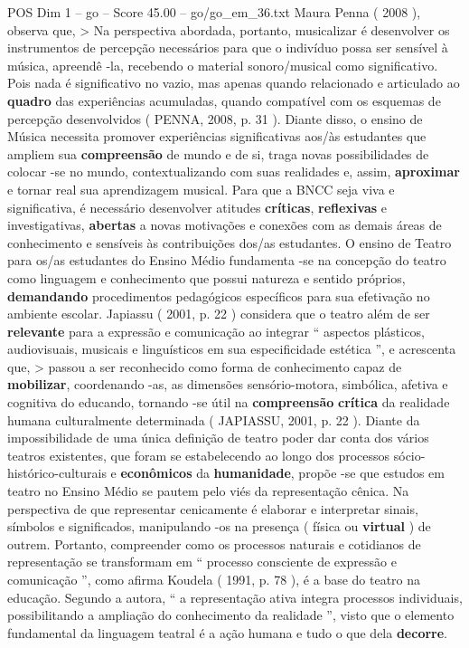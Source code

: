 \begin{textsample}{POS Dim 1 – go – Score 45.00 – go/go\_em\_36.txt}
Maura Penna ( 2008 ), observa que, > Na perspectiva abordada, portanto, musicalizar é desenvolver os instrumentos de percepção necessários para que o indivíduo possa ser sensível à música, apreendê -la, recebendo o material sonoro/musical como significativo.
Pois nada é significativo no vazio, mas apenas quando relacionado e articulado ao \textbf{quadro} das experiências acumuladas, quando compatível com os esquemas de percepção desenvolvidos ( PENNA, 2008, p. 31 ).
Diante disso, o ensino de Música necessita promover experiências significativas aos/às estudantes que ampliem sua \textbf{compreensão} de mundo e de si, traga novas possibilidades de colocar -se no mundo, contextualizando com suas realidades e, assim, \textbf{aproximar} e tornar real sua aprendizagem musical.
Para que a BNCC seja viva e significativa, é necessário desenvolver atitudes \textbf{críticas}, \textbf{reflexivas} e investigativas, \textbf{abertas} a novas motivações e conexões com as demais áreas de conhecimento e sensíveis às contribuições dos/as estudantes.
O ensino de Teatro para os/as estudantes do Ensino Médio fundamenta -se na concepção do teatro como linguagem e conhecimento que possui natureza e sentido próprios, \textbf{demandando} procedimentos pedagógicos específicos para sua efetivação no ambiente escolar.
Japiassu ( 2001, p. 22 ) considera que o teatro além de ser \textbf{relevante} para a expressão e comunicação ao integrar “ aspectos plásticos, audiovisuais, musicais e linguísticos em sua especificidade estética ”, e acrescenta que, > passou a ser reconhecido como forma de conhecimento capaz de \textbf{mobilizar}, coordenando -as, as dimensões sensório-motora, simbólica, afetiva e cognitiva do educando, tornando -se útil na \textbf{compreensão} \textbf{crítica} da realidade humana culturalmente determinada ( JAPIASSU, 2001, p. 22 ).
Diante da impossibilidade de uma única definição de teatro poder dar conta dos vários teatros existentes, que foram se estabelecendo ao longo dos processos sócio-histórico-culturais e \textbf{econômicos} da \textbf{humanidade}, propõe -se que estudos em teatro no Ensino Médio se pautem pelo viés da representação cênica.
Na perspectiva de que representar cenicamente é elaborar e interpretar sinais, símbolos e significados, manipulando -os na presença ( física ou \textbf{virtual} ) de outrem.
Portanto, compreender como os processos naturais e cotidianos de representação se transformam em “ processo consciente de expressão e comunicação ”, como afirma Koudela ( 1991, p. 78 ), é a base do teatro na educação.
Segundo a autora, “ a representação ativa integra processos individuais, possibilitando a ampliação do conhecimento da realidade ”, visto que o elemento fundamental da linguagem teatral é a ação humana e tudo o que dela \textbf{decorre}.

\end{textsample}
